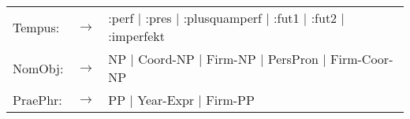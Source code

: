 \begin{tabular}{lll}
Tempus: & $\rightarrow$ &
        :perf $\mid$  :pres $\mid$  :plusquamperf $\mid$  :fut1 $\mid$
        :fut2 $\mid$  :imperfekt \\
NomObj: & $\rightarrow$ &
        NP $\mid$  Coord-NP $\mid$  Firm-NP $\mid$  PersPron $\mid$ 
        Firm-Coor-NP\\                 

PraePhr: & $\rightarrow$ & PP $\mid$  Year-Expr $\mid$  Firm-PP

\end{tabular}

\newpage



